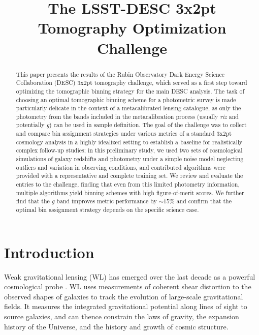 \documentclass[twocolumn,twocolappendix]{aastex63}
\begin{document}
\title{The LSST-DESC 3x2pt Tomography Optimization Challenge}


\begin{abstract}
This paper presents the results of the Rubin Observatory Dark Energy Science Collaboration (DESC) 3x2pt tomography challenge, which served as a first step toward optimizing the tomographic binning strategy for the main DESC analysis. 
The task of choosing an optimal tomographic binning scheme for a photometric survey is made particularly delicate in the context of a metacalibrated lensing catalogue, as only the photometry from the bands included in the metacalibration process (usually {\em riz} and potentially {\em g}) can be used in sample definition.
The goal of the challenge was to collect and compare bin assignment strategies under various metrics of a standard 3x2pt cosmology analysis in a highly idealized setting to establish a baseline for realistically complex follow-up studies; 
in this preliminary study, we used two sets of cosmological simulations of galaxy redshifts and photometry under a simple noise model neglecting outliers and variation in observing conditions, and contributed algorithms were provided with a representative and complete training set.
We review and evaluate the entries to the challenge, finding that even from this limited photometry information, multiple algorithms yield binning schemes with high figure-of-merit scores.
We further find that the {\em g} band improves metric performance by $\sim15\%$ and confirm that the optimal bin assignment strategy depends on the specific science case.
\end{abstract}





\section{Introduction}
Weak gravitational lensing (WL) has emerged over the last decade as a powerful
cosmological probe \citep{cfhtlens,rcslens,des,kids,hsc}.  WL
uses measurements of coherent shear distortion to the observed shapes of galaxies
to track the evolution of large-scale gravitational fields.  It measures the integrated
gravitational potential along lines of sight to source galaxies, and can thence constrain
the laws of gravity, the expansion history of the Universe, and the history and growth
of cosmic structure.
\end{document}
